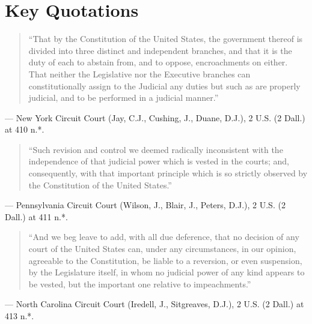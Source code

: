 \documentclass[12pt]{article}
\begin{document}
\section{Key Quotations}

\begin{quote}
``That by the Constitution of the United States, the government thereof is divided into three distinct and independent branches, and that it is the duty of each to abstain from, and to oppose, encroachments on either. That neither the Legislative nor the Executive branches can constitutionally assign to the Judicial any duties but such as are properly judicial, and to be performed in a judicial manner.''
\end{quote}
\noindent --- New York Circuit Court (Jay, C.J., Cushing, J., Duane, D.J.), 2 U.S. (2 Dall.) at 410 n.*.

\begin{quote}
``Such revision and control we deemed radically inconsistent with the independence of that judicial power which is vested in the courts; and, consequently, with that important principle which is so strictly observed by the Constitution of the United States.''
\end{quote}
\noindent --- Pennsylvania Circuit Court (Wilson, J., Blair, J., Peters, D.J.), 2 U.S. (2 Dall.) at 411 n.*.

\begin{quote}
``And we beg leave to add, with all due deference, that no decision of any court of the United States can, under any circumstances, in our opinion, agreeable to the Constitution, be liable to a reversion, or even suspension, by the Legislature itself, in whom no judicial power of any kind appears to be vested, but the important one relative to impeachments.''
\end{quote}
\noindent --- North Carolina Circuit Court (Iredell, J., Sitgreaves, D.J.), 2 U.S. (2 Dall.) at 413 n.*.
\end{document}

